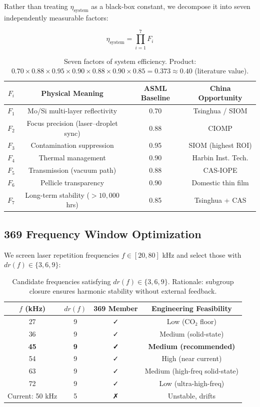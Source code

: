 \documentclass[twocolumn]{article}
\begin{document}
Rather than treating $\eta_{\text{system}}$ as a black-box constant, we decompose it into seven independently measurable factors:

\[
\eta_{\text{system}} = \prod_{i=1}^{7} F_i
\]

\begin{table}[h]
\centering
\begin{tabular}{|c|c|c|c|}
\hline
$F_i$ & Physical Meaning & ASML Baseline & China Opportunity \\
\hline
$F_1$ & Mo/Si multi-layer reflectivity & 0.70 & Tsinghua / SIOM \\
$F_2$ & Focus precision (laser–droplet sync) & 0.88 & CIOMP \\
$F_3$ & Contamination suppression & 0.95 & SIOM (highest ROI) \\
$F_4$ & Thermal management & 0.90 & Harbin Inst. Tech. \\
$F_5$ & Transmission (vacuum path) & 0.88 & CAS-IOPE \\
$F_6$ & Pellicle transparency & 0.90 & Domestic thin film \\
$F_7$ & Long-term stability ($>10{,}000$ hrs) & 0.85 & Tsinghua + CAS \\
\hline
\end{tabular}
\caption{Seven factors of system efficiency. Product: $0.70 \times 0.88 \times 0.95 \times 0.90 \times 0.88 \times 0.90 \times 0.85 = 0.373 \approx 0.40$ (literature value).}
\end{table}

\subsection{369 Frequency Window Optimization}

We screen laser repetition frequencies $f \in [20, 80]$ kHz and select those with $dr(f) \in \{3, 6, 9\}$:

\begin{table}[h]
\centering
\begin{tabular}{|c|c|c|c|}
\hline
$f$ (kHz) & $dr(f)$ & 369 Member & Engineering Feasibility \\
\hline
27 & 9 & ✓ & Low (CO₂ floor) \\
36 & 9 & ✓ & Medium (solid-state) \\
\textbf{45} & \textbf{9} & \textbf{✓} & \textbf{Medium (recommended)} \\
54 & 9 & ✓ & High (near current) \\
63 & 9 & ✓ & Medium (high-freq solid-state) \\
72 & 9 & ✓ & Low (ultra-high-freq) \\
\hline
Current: 50 kHz & 5 & ✗ & Unstable, drifts \\
\hline
\end{tabular}
\caption{Candidate frequencies satisfying $dr(f) \in \{3,6,9\}$. Rationale: subgroup closure ensures harmonic stability without external feedback.}
\end{table}
\end{document}
